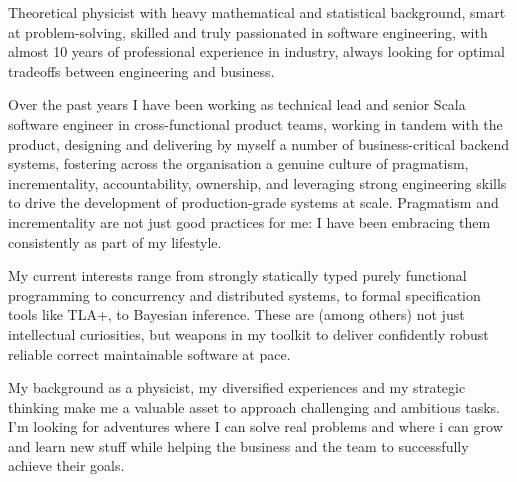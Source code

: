 
\begin{cvparagraph}
Theoretical physicist with heavy mathematical and statistical 
background, smart at problem-solving, skilled and truly passionated in software engineering, with almost 10 years of professional experience in industry, always looking for optimal tradeoffs between engineering and business.

  Over the past years I have been working as technical lead and senior Scala software engineer in cross-functional product teams, working in tandem with the product, designing and delivering by myself a number of business-critical backend systems, fostering  across the organisation a genuine culture of pragmatism, incrementality, accountability, ownership, and leveraging strong engineering skills 
  to drive the development of production-grade systems at scale. Pragmatism and incrementality are not just good practices for me: I have been embracing them consistently as part of my lifestyle.

  My current interests range from strongly statically typed purely functional programming to concurrency and distributed systems, to formal specification tools like TLA+, to Bayesian inference. These are (among others) not just intellectual curiosities, but weapons in my toolkit to deliver confidently robust reliable correct maintainable software at pace. 

My background as a physicist, my diversified experiences and my strategic thinking make me a valuable asset to approach challenging and ambitious tasks. I'm looking for adventures where I can solve real problems and where i can grow and learn new stuff while helping the business and the team to successfully achieve their goals. 
\end{cvparagraph}
